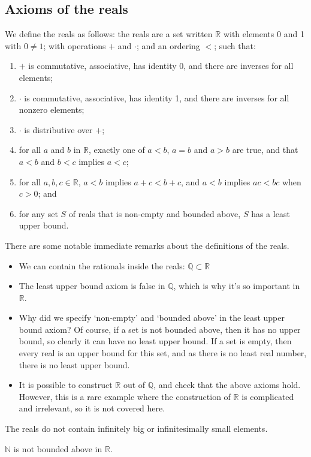 \subsection{Axioms of the reals}
We define the reals as follows: the reals are a set written \(\mathbb R\) with elements 0 and 1 with \(0 \neq 1\); with operations \(+\) and \(\cdot\); and an ordering \(<\); such that:
\begin{enumerate}
	\item \(+\) is commutative, associative, has identity 0, and there are inverses for all elements;
	\item \(\cdot\) is commutative, associative, has identity 1, and there are inverses for all nonzero elements;
	\item \(\cdot\) is distributive over \(+\);
	\item for all \(a\) and \(b\) in \(\mathbb R\), exactly one of \(a<b\), \(a=b\) and \(a>b\) are true, and that \(a<b\) and \(b<c\) implies \(a<c\);
	\item for all \(a, b, c \in \mathbb R\), \(a<b\) implies \(a + c < b + c\), and \(a<b\) implies \(ac < bc\) when \(c > 0\); and
	\item for any set \(S\) of reals that is non-empty and bounded above, \(S\) has a least upper bound.
\end{enumerate}
There are some notable immediate remarks about the definitions of the reals.
\begin{itemize}
	\item We can contain the rationals inside the reals: \(\mathbb Q \subset \mathbb R\)
	\item The least upper bound axiom is false in \(\mathbb Q\), which is why it's so important in \(\mathbb R\).
	\item Why did we specify `non-empty' and `bounded above' in the least upper bound axiom?
	      Of course, if a set is not bounded above, then it has no upper bound, so clearly it can have no least upper bound.
	      If a set is empty, then every real is an upper bound for this set, and as there is no least real number, there is no least upper bound.
	\item It is possible to construct \(\mathbb R\) out of \(\mathbb Q\), and check that the above axioms hold.
	      However, this is a rare example where the construction of \(\mathbb R\) is complicated and irrelevant, so it is not covered here.
\end{itemize}
The reals do not contain infinitely big or infinitesimally small elements.
\begin{proposition}
	\(\mathbb N\) is not bounded above in \(\mathbb R\).
\end{proposition}
